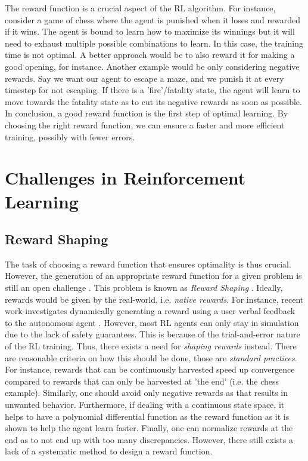 \documentclass[a4paper,11pt]{article}
\theoremstyle{definition}
\begin{document}
\medskip 

The reward function is a crucial aspect of the RL algorithm. For instance, consider a game of chess 
where the agent is punished when it loses and rewarded if it wins. The agent is bound to learn how to 
maximize its winnings but it will need to exhaust multiple possible combinations to learn. In this case, 
the training time is not optimal. A better approach would be to also reward it for making a good opening, for instance. 
Another example would be only considering negative rewards. Say we want our agent to escape a maze, and we punish it at every timestep for not escaping. 
If there is a 'fire'/fatality state, the agent will learn to move towards the fatality state as to cut its negative rewards as soon as possible. 
In conclusion, a good reward function is the first step of optimal learning. By choosing the right reward function, 
we can ensure a faster and more efficient training, possibly with fewer errors. 

\section{Challenges in Reinforcement Learning}

\subsection{Reward Shaping}
The task of choosing a reward function that ensures optimality is thus crucial. However, the generation of an appropriate 
reward function for a given problem is still an open challenge \cite{kober2013}. This problem is known as \textit{Reward Shaping} \cite{laud2011}.  
Ideally, rewards would be given by the real-world, i.e. \textit{native rewards}. For instance, recent work investigates dynamically generating a reward 
using a user verbal feedback to the autonomous agent \cite{gonzalez2010}. However, most RL agents 
can only stay in simulation due to the lack of safety guarantees. This is because of the trial-and-error nature of the RL training. 
Thus, there exists a need for \textit{shaping rewards} instead. There are reasonable criteria on how this should be done, those are \emph{standard practices}. For instance, 
rewards that can be continuously harvested speed up convergence compared to rewards that can only be harvested at 'the end' (i.e. the chess example). Similarly, one should avoid only 
negative rewards as that results in unwanted behavior. Furthermore, if dealing with a continuous state space, it helps to have a polynomial differential function as the reward function 
as it is shown to help the agent learn faster. Finally, one can normalize rewards at the end as to not end up with too many discrepancies. 
However, there still exists a lack of a systematic method to design a reward function.
\end{document}
